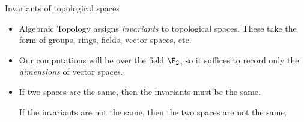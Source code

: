 \documentclass[usenames,dvipsnames,aspectratio=1610]{beamer}
\begin{document}

\begin{frame}{Invariants of topological spaces}
  \begin{itemize}
    \item Algebraic Topology assigns {\em invariants} to topological spaces.
      These take the form of groups, rings, fields, vector spaces, etc.
    \item Our computations will be over the field $\F_2$, so it suffices to record
      only the {\em dimensions} of vector spaces. 
    \item If two spaces are the same, then the invariants must be the same. 
      
      If the invariants are not the same, then the two spaces are not the same.
  \end{itemize}
\end{frame}

\end{document}
